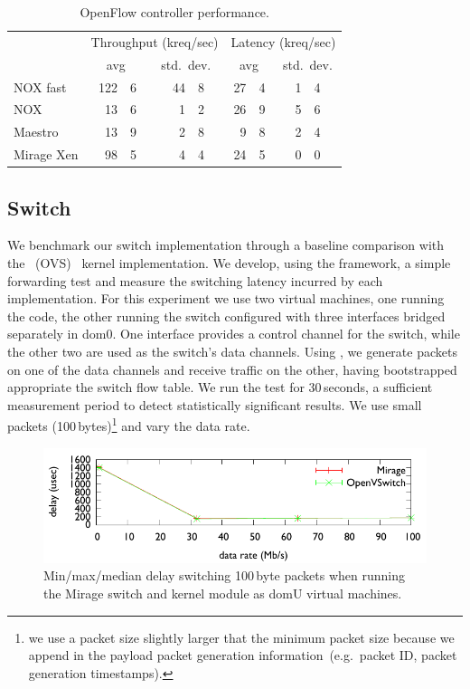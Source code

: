 \begin{table}
\newcommand\T{\rule{0pt}{2.6ex}}
\newcommand\B{\rule[-1.2ex]{0pt}{0pt}}
\centering
\begin{tabular} {l |r@{.}l r@{.}l|r@{.}l r@{.}l}
\hline
\T \multirow{2}{*}{Controller} 
   & \multicolumn{4}{c|}{Throughput (kreq/sec)}  
   & \multicolumn{4}{c}{Latency (kreq/sec)} \\
\B & \multicolumn{2}{c}{avg} & \multicolumn{2}{c|}{std.\ dev.} 
   & \multicolumn{2}{c}{avg} & \multicolumn{2}{c}{std.\ dev.} \\
\hline
\T NOX fast   & 122&6 & \quad{} 44&8 & 27&4 & \quad{} 1&4 \\
NOX           &  13&6 &  1&2 & 26&9 & 5&6 \\
Maestro       &  13&9 &  2&8 &  9&8 & 2&4 \\
\B Mirage Xen &  98&5 &  4&4 & 24&5 & 0&0 \\
\hline
\end{tabular}
\caption{\label{tbl:controller}OpenFlow controller performance.}
\end{table}

\subsection{\mirage Switch} \label{sec:of-switch-perf}

We benchmark our \mirage \of switch implementation through a baseline comparison
with the \ovs~(OVS)~\cite{openvswitch} kernel implementation.  We
develop, using the \oflops framework, a simple forwarding test and measure the
switching latency incurred by each implementation.  For this experiment we use
two virtual machines, one running the \oflops code, the other running the
\of switch configured with three interfaces bridged separately in dom0. One
interface provides a control channel for the switch, while the other two are
used as the switch's data channels. Using \oflops, we generate packets on one of
the data channels and receive traffic on the other, having bootstrapped appropriate
the switch flow table. We run the test for
30\,seconds, a sufficient measurement period to detect statistically significant
results. We use small packets (100\,bytes)\footnote{we use a packet size
  slightly larger that the minimum packet size because we append in the
  payload packet generation information~(e.g.~packet ID, packet generation
  timestamps).} and vary the data rate.

\begin{figure}
\centering
\includegraphics[width=\columnwidth]{switch-media-delay}
\caption{\label{fig:switch}Min/max/median delay switching 100\,byte packets
        when running the Mirage switch and \ovs kernel module as domU
        virtual machines.}
\end{figure}

